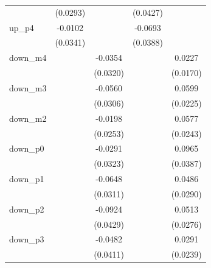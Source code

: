 \begin{table}[htbp]
\begin{tabular}{l*{4}{c}}
                    &    (0.0293)         &                     &    (0.0427)         &                     \\
[1em]
up\_p4               &     -0.0102         &                     &     -0.0693\sym{*}  &                     \\
                    &    (0.0341)         &                     &    (0.0388)         &                     \\
[1em]
down\_m4             &                     &     -0.0354         &                     &      0.0227         \\
                    &                     &    (0.0320)         &                     &    (0.0170)         \\
[1em]
down\_m3             &                     &     -0.0560\sym{*}  &                     &      0.0599\sym{***}\\
                    &                     &    (0.0306)         &                     &    (0.0225)         \\
[1em]
down\_m2             &                     &     -0.0198         &                     &      0.0577\sym{**} \\
                    &                     &    (0.0253)         &                     &    (0.0243)         \\
[1em]
down\_p0             &                     &     -0.0291         &                     &      0.0965\sym{**} \\
                    &                     &    (0.0323)         &                     &    (0.0387)         \\
[1em]
down\_p1             &                     &     -0.0648\sym{**} &                     &      0.0486\sym{*}  \\
                    &                     &    (0.0311)         &                     &    (0.0290)         \\
[1em]
down\_p2             &                     &     -0.0924\sym{**} &                     &      0.0513\sym{*}  \\
                    &                     &    (0.0429)         &                     &    (0.0276)         \\
[1em]
down\_p3             &                     &     -0.0482         &                     &      0.0291         \\
                    &                     &    (0.0411)         &                     &    (0.0239)         \\

\end{tabular}
\end{table}
